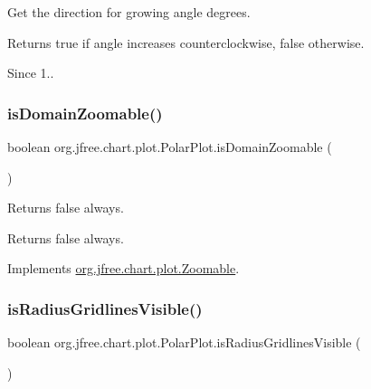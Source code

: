 Get the direction for growing angle degrees.

\begin{DoxyReturn}{Returns}
{\ttfamily true} if angle increases counterclockwise, {\ttfamily false} otherwise. 
\end{DoxyReturn}
\begin{DoxySince}{Since}
1.. 
\end{DoxySince}
\mbox{\label{classorg_1_1jfree_1_1chart_1_1plot_1_1_polar_plot_ad077d0e320047532577c86cc50f1ddec}} 
\subsubsection{\texorpdfstring{is\+Domain\+Zoomable()}{isDomainZoomable()}}
{\footnotesize\ttfamily boolean org.\+jfree.\+chart.\+plot.\+Polar\+Plot.\+is\+Domain\+Zoomable (\begin{DoxyParamCaption}{ }\end{DoxyParamCaption})}

Returns {\ttfamily false} always.

\begin{DoxyReturn}{Returns}
{\ttfamily false} always. 
\end{DoxyReturn}


Implements \mbox{\hyperlink{interfaceorg_1_1jfree_1_1chart_1_1plot_1_1_zoomable_a7c10a2f8573d8238ce31a4ee8d7dd2db}{org.\+jfree.\+chart.\+plot.\+Zoomable}}.

\mbox{\label{classorg_1_1jfree_1_1chart_1_1plot_1_1_polar_plot_a671ccfb1c60f6f84f03268404cc12029}} 
\subsubsection{\texorpdfstring{is\+Radius\+Gridlines\+Visible()}{isRadiusGridlinesVisible()}}
{\footnotesize\ttfamily boolean org.\+jfree.\+chart.\+plot.\+Polar\+Plot.\+is\+Radius\+Gridlines\+Visible (\begin{DoxyParamCaption}{ }\end{DoxyParamCaption})}


